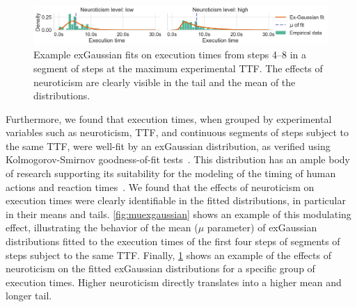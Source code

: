 \begin{figure}
    \centering
    \includegraphics[width=\textwidth]{figs/new_model/dist_fits_neuro.png}
    \caption{%
        Example \ac{exGaussian} fits on execution times from steps \numrange{4}{8} in a segment of steps at the maximum experimental \ac{TTF}.
        The effects of neuroticism are clearly visible in the tail and the mean of the distributions.
    }\label{fig:fitsneuro}
\end{figure}

Furthermore, we found that execution times, when grouped by experimental variables such as neuroticism, \ac{TTF}, and continuous segments of steps subject to the same \ac{TTF}, were well-fit by an \ac{exGaussian} distribution, as verified using Kolmogorov-Smirnov goodness-of-fit tests~\cite{massey1951kolmogorov}.
This distribution has an ample body of research supporting its suitability for the modeling of the timing of human actions and reaction times~\cite{Rohrer1994analysis,Palmer2011shapes,Marmolejo2022generalised}.
We found that the effects of neuroticism on execution times were clearly identifiable in the fitted distributions, in particular in their means and tails.
\cref{fig:muexgaussian} shows an example of this modulating effect, illustrating the behavior of the mean (\( \mu \) parameter) of \ac{exGaussian} distributions fitted to the execution times of the first four steps of segments of steps subject to the same \ac{TTF}.
Finally, \cref{fig:fitsneuro} shows an example of the effects of neuroticism on the fitted \ac{exGaussian} distributions for a specific group of execution times.
Higher neuroticism directly translates into a higher mean and longer tail.